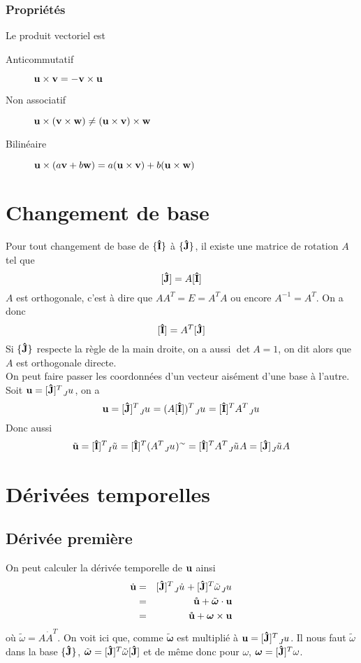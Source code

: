 \documentclass[11pt,a4paper]{article}
\newcommand\fv[1]{{\bf #1}} %
\newcommand\fvd[1]{\dot{\bf #1}} %
\newcommand\fvr[1]{\mathring{\bf #1}} %
\newcommand\ui{{\bf\hat{I}}} %
\newcommand\uj{{\bf\hat{J}}} %
\newcommand\wrt[2]{\ensuremath{\tensor*[_{ #1}]{ #2}{}}} %
\newcommand\omegaf{{\bm \omega}}
\newcommand\omegaft{\tilde{\bm \omega}}
\newcommand\omegat{\tilde{\omega}}
\begin{document}
\subsubsection{Propriétés}
Le produit vectoriel est
\begin{description}
	\item[Anticommutatif] $\fv{u} \times \fv{v} = - \fv{v} \times \fv{u}$
	\item[Non associatif] $\fv{u} \times (\fv{v} \times \fv{w}) \neq (\fv{u} \times \fv{v}) \times \fv{w}$
	\item[Bilinéaire] $\fv{u} \times (a\fv{v} + b\fv{w}) = a (\fv{u} \times \fv{v}) + b (\fv{u} \times \fv{w})$
\end{description}

\section{Changement de base}
Pour tout changement de base de $\{\ui\}$ à $\{\uj\}$, il existe une matrice de rotation $A$ tel que
\[ [\uj] = A [\ui] \]
$A$ est orthogonale, c'est à dire que $AA^T = E = A^TA$ ou encore $A^{-1} = A^T$.
On a donc
\[ [\ui] = A^T [\uj] \]
Si $\{\uj\}$ respecte la règle de la main droite, on a aussi $\det A = 1$, on dit alors que $A$ est orthogonale directe.\\
On peut faire passer les coordonnées d'un vecteur aisément d'une base à l'autre.
Soit $\fv{u} = [\uj]^T \wrt{J}{u}$, on a
\[ \fv{u} = [\uj]^T \wrt{J}{u} = (A[\ui])^T \wrt{J}{u} = [\ui]^TA^T \wrt{J}{u} \]
Donc aussi
\[ \tilde{\fv{u}} = [\ui]^T \wrt{I}{\tilde{u}} = [\ui]^T (A^T \wrt{J}{u})^{\sim} = [\ui]^T A^T \wrt{J}{\tilde{u}} A = [\uj] \wrt{J}{\tilde{u}} A \]

\section{Dérivées temporelles}

\subsection{Dérivée première}
On peut calculer la dérivée temporelle de $\fv{u}$ ainsi
\begin{eqnarray*}
	\fvd{u} &=& [\uj]^T \wrt{J}{\dot{u}} + [\uj]^T \omegat\wrt{J}{u}\\
	&=& \fvr{u} + \omegaft \cdot \fv{u}\\
	&=& \fvr{u} + \omegaf \times \fv{u}
\end{eqnarray*}
où $\omegat = A\dot{A}^T$.
On voit ici que, comme $\omegaft$ est multiplié à $\fv{u} = [\uj]^T \wrt{J}{u}$.
Il nous faut $\omegat$ dans la base $\{\uj\}$, $\omegaft = [\uj]^T \omegat [\uj]$ et de même donc pour $\omega$, $\omegaf = [\uj]^T \omega$.
\end{document}
